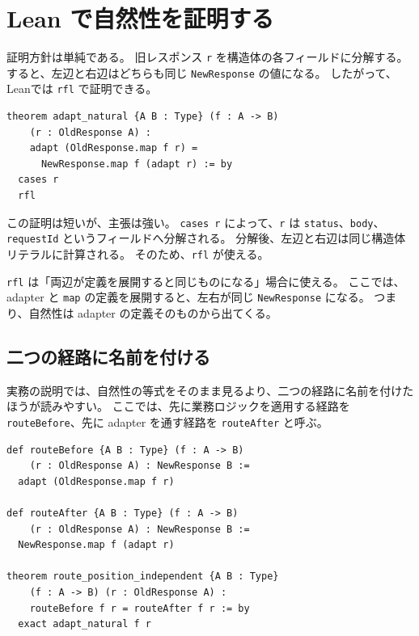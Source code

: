 \section{Lean で自然性を証明する}

証明方針は単純である。
旧レスポンス \texttt{r} を構造体の各フィールドに分解する。
すると、左辺と右辺はどちらも同じ \texttt{NewResponse} の値になる。
したがって、Leanでは \texttt{rfl} で証明できる。

\begin{listing}[htbp]
\begin{verbatim}
theorem adapt_natural {A B : Type} (f : A -> B)
    (r : OldResponse A) :
    adapt (OldResponse.map f r) =
      NewResponse.map f (adapt r) := by
  cases r
  rfl
\end{verbatim}
\caption{adapterの自然性}
\label{lst:ch25-adapt-natural}
\end{listing}

この証明は短いが、主張は強い。
\texttt{cases r} によって、\texttt{r} は \texttt{status}、\texttt{body}、\texttt{requestId} というフィールドへ分解される。
分解後、左辺と右辺は同じ構造体リテラルに計算される。
そのため、\texttt{rfl} が使える。

\begin{leanbox}
\texttt{rfl} は「両辺が定義を展開すると同じものになる」場合に使える。
ここでは、adapter と \texttt{map} の定義を展開すると、左右が同じ \texttt{NewResponse} になる。
つまり、自然性は adapter の定義そのものから出てくる。
\end{leanbox}

\subsection{二つの経路に名前を付ける}

実務の説明では、自然性の等式をそのまま見るより、二つの経路に名前を付けたほうが読みやすい。
ここでは、先に業務ロジックを適用する経路を \texttt{routeBefore}、先に adapter を通す経路を \texttt{routeAfter} と呼ぶ。

\begin{listing}[htbp]
\begin{verbatim}
def routeBefore {A B : Type} (f : A -> B)
    (r : OldResponse A) : NewResponse B :=
  adapt (OldResponse.map f r)

def routeAfter {A B : Type} (f : A -> B)
    (r : OldResponse A) : NewResponse B :=
  NewResponse.map f (adapt r)

theorem route_position_independent {A B : Type}
    (f : A -> B) (r : OldResponse A) :
    routeBefore f r = routeAfter f r := by
  exact adapt_natural f r
\end{verbatim}
\caption{adapterを置く位置が違う二つの経路}
\label{lst:ch25-routes}
\end{listing}

